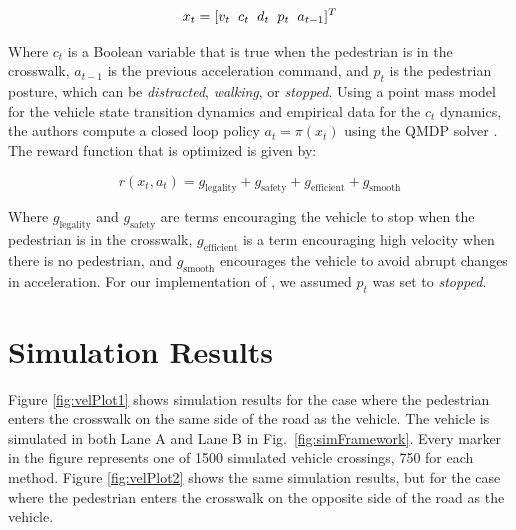 \documentclass[letterpaper, 10 pt, conference]{ieeeconf} %
\begin{document}
\begin{equation}
x_t = [v_t \hspace{2mm} c_t \hspace{2mm} d_t \hspace{2mm} p_t \hspace{2mm} a_{t-1}]^T
\end{equation}

Where $c_t$ is a Boolean variable that is true when the pedestrian is in the crosswalk, $a_{t-1}$ is the previous acceleration command, and $p_t$ is the pedestrian posture, which can be \textit{distracted}, \textit{walking}, or \textit{stopped}. Using a point mass model for the vehicle state transition dynamics and empirical data for the $c_t$ dynamics, the authors compute a closed loop policy $a_t = \pi(x_t)$ using the QMDP solver \cite{Kochenderfer2015}. The reward function that is optimized is given by: 

\begin{equation}
r(x_t, a_t) = g_\mathrm{legality} + g_\mathrm{safety} + g_\mathrm{efficient} + g_\mathrm{smooth}
\end{equation}

Where $g_\mathrm{legality}$ and $g_\mathrm{safety}$ are terms encouraging the vehicle to stop when the pedestrian is in the crosswalk, $g_\mathrm{efficient}$ is a term encouraging high velocity when there is no pedestrian, and $g_\mathrm{smooth}$ encourages the vehicle to avoid abrupt changes in acceleration. For our implementation of \cite{Thornton2018}, we assumed $p_t$ was set to \textit{stopped}. 

\section{Simulation Results}

Figure \ref{fig:velPlot1} shows simulation results for the case where the pedestrian enters the crosswalk on the same side of the road as the vehicle. The vehicle is simulated in both Lane A and Lane B in Fig.~\ref{fig:simFramework}. Every marker in the figure represents one of 1500 simulated vehicle crossings, 750 for each method. Figure \ref{fig:velPlot2} shows the same simulation results, but for the case where the pedestrian enters the crosswalk on the opposite side of the road as the vehicle.
\end{document}

